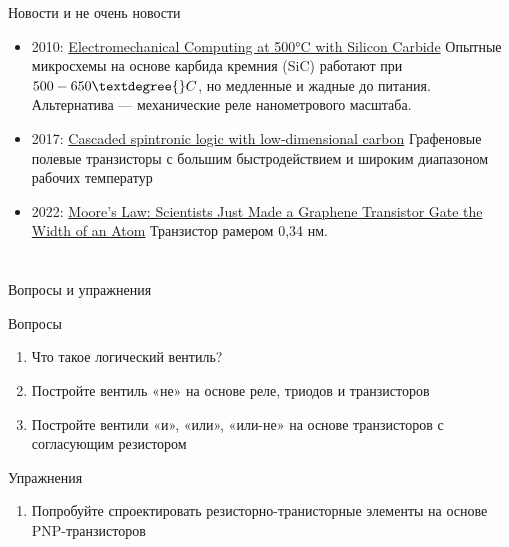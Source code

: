 \documentclass[xetex,aspectratio=43]{beamer}
\begin{document}
\begin{frame}{Новости и не очень новости}
\begin{itemize}
\item
  2010: \href{https://www.science.org/doi/abs/10.1126/science.1192511}{Electromechanical Computing at 500°C with Silicon Carbide}
  Опытные микросхемы на основе карбида кремния (SiC)
  работают при $500-650 \textdegree{}C$, но медленные и жадные до питания.
  Альтернатива --- механические реле нанометрового масштаба.
\item
  2017: \href{https://www.nature.com/articles/ncomms15635}{Cascaded spintronic logic with low-dimensional carbon}
  Графеновые полевые транзисторы с большим быстродействием и широким диапазоном рабочих температур
\item
  2022: \href{https://singularityhub.com/2022/03/13/moores-law-scientists-just-made-a-graphene-transistor-gate-the-width-of-an-atom/}{Moore’s Law: Scientists Just Made a Graphene Transistor Gate the Width of an Atom}
  Транзистор рамером 0,34 нм.
\end{itemize}

\end{frame}

\section*{}

\begin{frame}{Вопросы и упражнения}
    \begin{block}{Вопросы}
        \begin{enumerate}
        \item
          Что такое логический вентиль?
        \item
          Постройте вентиль «не» на основе реле, триодов и транзисторов
        \item
          Постройте вентили «и», «или», «или-не» на основе транзисторов с
          согласующим резистором
        \end{enumerate}
    \end{block}

    \begin{block}{Упражнения}
    \begin{enumerate}
        \item Попробуйте спроектировать резисторно-транисторные элементы на основе PNP-транзисторов
    \end{enumerate}
\end{block}

\end{frame}

\postamble
\end{document}
